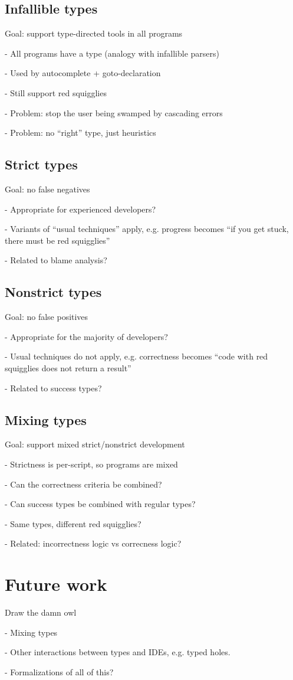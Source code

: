 \documentclass[acmsmall]{acmart}
\begin{document}
\subsection{Infallible types}

Goal: support type-directed tools in all programs

- All programs have a type (analogy with infallible parsers)

- Used by autocomplete + goto-declaration

- Still support red squigglies

- Problem: stop the user being swamped by cascading errors

- Problem: no ``right'' type, just heuristics

\subsection{Strict types}

Goal: no false negatives

- Appropriate for experienced developers?

- Variants of ``usual techniques'' apply, e.g. progress becomes ``if you get stuck, there must be red squigglies''

- Related to blame analysis?

\subsection{Nonstrict types}

Goal: no false positives

- Appropriate for the majority of developers?

- Usual techniques do not apply, e.g. correctness becomes ``code with red squigglies does not return a result''

- Related to success types?

\subsection{Mixing types}

Goal: support mixed strict/nonstrict development

- Strictness is per-script, so programs are mixed

- Can the correctness criteria be combined?

- Can success types be combined with regular types?

- Same types, different red squigglies?

- Related: incorrectness logic vs correcness logic?

\section{Future work}

Draw the damn owl

- Mixing types

- Other interactions between types and IDEs, e.g. typed holes.

- Formalizations of all of this?

 
\end{document}
